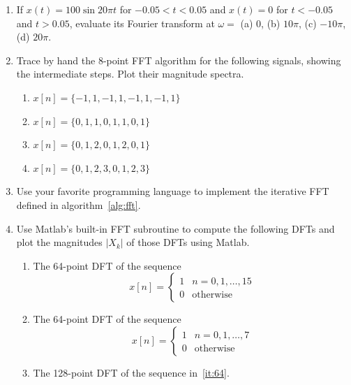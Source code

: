 \begin{enumerate}
\item If $x(t)=100\sin 20\pi t$ for $-0.05<t<0.05$ and $x(t)=0$ for
$t<-0.05$ and $t>0.05$, evaluate its Fourier transform at $\omega=$
(a) 0, (b) $10\pi$, (c) $-10\pi$, (d) $20\pi$.

\item Trace by hand the 8-point FFT algorithm for the following signals,
  showing the intermediate steps. Plot their magnitude spectra.
\begin{enumerate}
\item $x[n] = \{-1, 1, -1, 1, -1, 1, -1, 1\} $

\item $x[n] = \{0,1,1,0,1,1,0,1\}$

\item $x[n] = \{0,1,2,0,1,2,0,1\}$

\item $x[n] = \{0,1,2,3,0,1,2,3\}$
\end{enumerate}

\item Use your favorite programming language to implement the
iterative FFT defined in algorithm~\ref{alg:fft}.

\item Use Matlab's built-in FFT subroutine to compute the following
DFTs and plot the magnitudes $|X_k|$ of those DFTs using Matlab.
\begin{enumerate}
\item The 64-point DFT of the sequence
\begin{equation*}
x[n]=\left\{\begin{array}{ll}
                        1 &  n=0,1,\ldots,15 \\
                        0 &  \text{otherwise}
           \end{array}\right.
\end{equation*}

\item The 64-point DFT of the sequence 
\label{it:64}
\begin{equation*}
x[n]=\left\{\begin{array}{ll}
                        1 & n=0,1,\ldots,7 \\
                        0 & \text{otherwise}
           \end{array}\right.
\end{equation*}

\item The 128-point DFT of the sequence in~\ref{it:64}.


\end{enumerate}
\end{enumerate}
